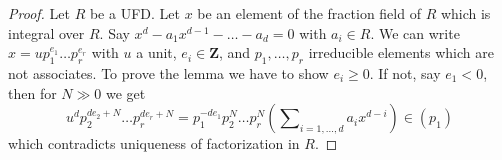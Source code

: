 \documentclass[10pt,a4paper]{amsart}
\theoremstyle{plain}
\theoremstyle{definition}
\theoremstyle{remark}
\numberwithin{equation}{subsection}
\begin{document}
\begin{proof}
Let $R$ be a UFD. Let $x$ be an element of the fraction field of
$R$ which is integral over $R$. Say $x^d - a_1 x^{d - 1} - \ldots - a_d = 0$
with $a_i \in R$. We can write
$x = u p_1^{e_1} \ldots p_r^{e_r}$ with $u$ a unit, $e_i \in \mathbf{Z}$,
and $p_1, \ldots, p_r$ irreducible elements which are not associates.
To prove the lemma we have to show $e_i \geq 0$. If not, say $e_1 < 0$,
then for $N \gg 0$ we get
$$
u^d p_2^{de_2 + N} \ldots p_r^{de_r + N} =
p_1^{-de_1}p_2^N \ldots p_r^N(
\sum\nolimits_{i = 1, \ldots, d} a_i x^{d - i} ) \in (p_1)
$$
which contradicts uniqueness of factorization in $R$.
\end{proof}
\end{document}
